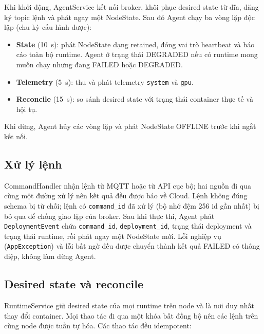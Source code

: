 Khi khởi động, AgentService kết nối broker, khôi phục desired state từ đĩa,
đăng ký topic lệnh và phát ngay một NodeState. Sau đó Agent chạy ba vòng lặp độc
lập (chu kỳ cấu hình được):

\begin{itemize}
  \item \textbf{State} (10~s): phát NodeState dạng retained, đóng vai trò heartbeat
        và báo cáo toàn bộ runtime. Agent ở trạng thái DEGRADED nếu có runtime
        mong muốn chạy nhưng đang FAILED hoặc DEGRADED.
  \item \textbf{Telemetry} (5~s): thu và phát telemetry \texttt{system} và \texttt{gpu}.
  \item \textbf{Reconcile} (15~s): so sánh desired state với trạng thái container
        thực tế và hội tụ.
\end{itemize}

Khi dừng, Agent hủy các vòng lặp và phát NodeState OFFLINE trước khi ngắt kết nối.

\subsection{Xử lý lệnh}

CommandHandler nhận lệnh từ MQTT hoặc từ API cục bộ; hai nguồn đi qua cùng một
đường xử lý nên kết quả đều được báo về Cloud. Lệnh không đúng schema bị từ chối;
lệnh có \texttt{command\_id} đã xử lý (bộ nhớ đệm 256 id gần nhất) bị bỏ qua để
chống giao lặp của broker. Sau khi thực thi, Agent phát \texttt{DeploymentEvent}
chứa \texttt{command\_id}, \texttt{deployment\_id}, trạng thái deployment và trạng
thái runtime, rồi phát ngay một NodeState mới. Lỗi nghiệp vụ (\texttt{AppException})
và lỗi bất ngờ đều được chuyển thành kết quả FAILED có thông điệp, không làm dừng Agent.

\subsection{Desired state và reconcile}

RuntimeService giữ desired state của mọi runtime trên node và là nơi duy nhất
thay đổi container. Mọi thao tác đi qua một khóa bất đồng bộ nên các lệnh trên
cùng node được tuần tự hóa. Các thao tác đều idempotent:

